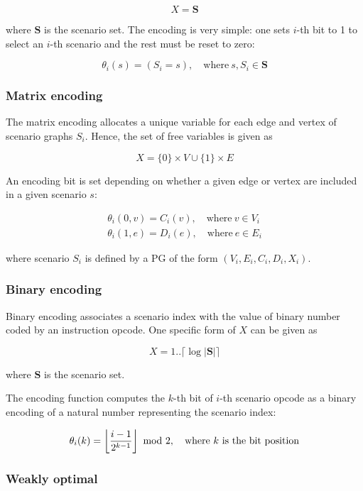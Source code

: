 $$
X = \mathbf{S}
$$

\noindent
where $\mathbf{S}$ is the scenario set. The encoding is very simple: one sets $i$-th bit to 1 to select an $i$-th scenario and the rest must be reset to zero:

$$\theta_i(s) = (S_i = s), \quad \text{where} ~ s, S_i \in \mathbf{S}$$


\subsubsection{Matrix encoding}

The matrix encoding allocates a unique variable for each edge and vertex of scenario graphs $S_i$. Hence, the set of free variables is given as

$$
X = \{0\}\times V \cup \{1\} \times  E
$$

\noindent
An encoding bit is set depending on whether a given edge or vertex are included in a given scenario $s$: 
 
$$
\begin{array}{l}
\theta_i(0, v) = C_i(v), \quad \text{where} ~ v \in V_i \\
\theta_i(1, e) = D_i(e), \quad \text{where} ~ e \in E_i  
\end{array}
$$

\noindent
where scenario $S_i$ is defined by a PG of the form $(V_i, E_i, C_i, D_i, X_i)$.

\subsubsection{Binary encoding}

Binary encoding associates a scenario index with the value of binary number coded by an instruction opcode. One specific form of $X$ can be given as    

$$
X = 1 .. \lceil \log | \mathbf{S} | \rceil
$$

\noindent
where $\mathbf{S}$ is the scenario set.


The encoding function computes the $k$-th bit of $i$-th scenario opcode as a binary encoding of a natural number representing the scenario index:
 
$$\theta_i(k) = \left \lfloor {i - 1 \over {2^{k-1}}} \right \rfloor ~\mathrm{mod}~2, \quad \text{where} ~ k ~ \text{is the bit position}$$

\subsubsection{Weakly optimal\label{sec:weakly-optimal-encoding}}

